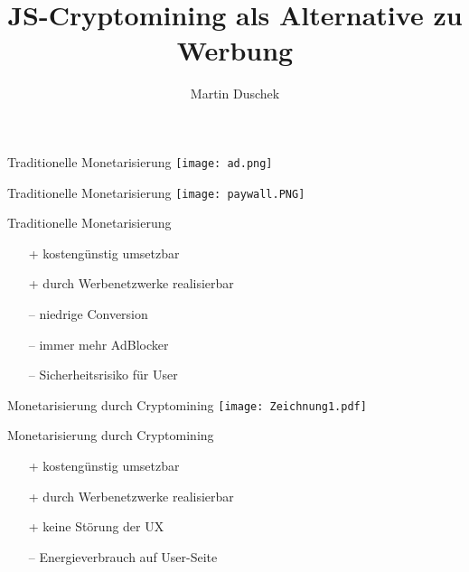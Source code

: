 \documentclass[11pt]{beamer}
\author{Martin Duschek}
\title{JS-Cryptomining als Alternative zu Werbung}
\institute{HTWK Leipzig}
\begin{document}
	\maketitle
	
	\begin{frame}{Traditionelle Monetarisierung}
		\centering
		\texttt{[image: ad.png]}
	\end{frame}

	\begin{frame}{Traditionelle Monetarisierung}
		\centering
		\texttt{[image: paywall.PNG]}
	\end{frame}
	
	\begin{frame} {Traditionelle Monetarisierung}
	\begin{itemize}
		\item[+] kostengünstig umsetzbar
		\item[+] durch Werbenetzwerke realisierbar
		\item[--] niedrige Conversion
		\item[--] immer mehr AdBlocker
		\item[--] Sicherheitsrisiko für User
	\end{itemize}
	\end{frame}

	\begin{frame} {Monetarisierung durch Cryptomining}
		\centering
		\texttt{[image: Zeichnung1.pdf]}
	\end{frame}

	\begin{frame} {Monetarisierung durch Cryptomining}
	\begin{itemize}
		\item[+] kostengünstig umsetzbar
		\item[+] durch Werbenetzwerke realisierbar
		\item[+] keine Störung der UX
		\item[--] Energieverbrauch auf User-Seite
	\end{itemize}
\end{frame}
\end{document}
